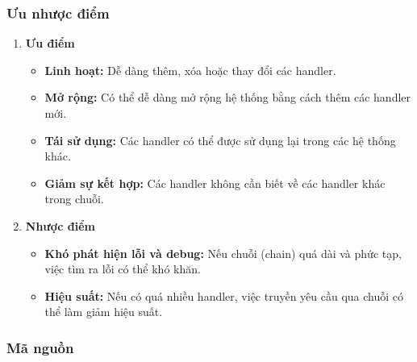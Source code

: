 \subsubsection{Ưu nhược điểm}
\begin{enumerate}
	\item \textbf{Ưu điểm}
	      \begin{itemize}
		      \item \textbf{Linh hoạt:} Dễ dàng thêm, xóa hoặc thay đổi các handler.
		      \item \textbf{Mở rộng:} Có thể dễ dàng mở rộng hệ thống bằng cách thêm các handler mới.
		      \item \textbf{Tái sử dụng:} Các handler có thể được sử dụng lại trong các hệ thống khác.
		      \item \textbf{Giảm sự kết hợp:} Các handler không cần biết về các handler khác trong chuỗi.
	      \end{itemize}
	\item \textbf{Nhược điểm}
	      \begin{itemize}
		      \item \textbf{Khó phát hiện lỗi và debug:} Nếu chuỗi (chain) quá dài và phức tạp, việc tìm ra lỗi có thể khó khăn.
		      \item \textbf{Hiệu suất:} Nếu có quá nhiều handler, việc truyền yêu cầu qua chuỗi có thể làm giảm hiệu suất.
	      \end{itemize}
\end{enumerate}

\subsubsection{Mã nguồn}
